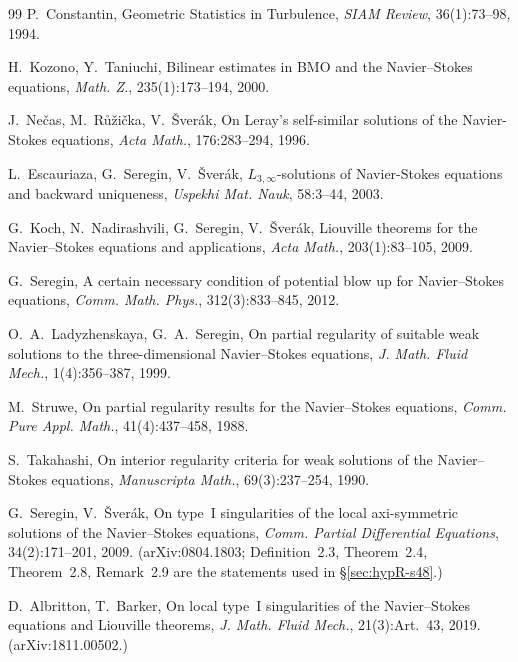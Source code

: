 \documentclass[11pt]{article}
\theoremstyle{definition}
\theoremstyle{remark}
\begin{document}
\begin{thebibliography}{99}
  P.~Constantin,
  Geometric Statistics in Turbulence,
  \emph{SIAM Review}, 36(1):73--98, 1994.

  H.~Kozono, Y.~Taniuchi,
  Bilinear estimates in BMO and the Navier--Stokes equations,
  \emph{Math. Z.}, 235(1):173--194, 2000.

  J.~Ne\v{c}as, M.~R\r{u}\v{z}i\v{c}ka, V.~\v{S}ver\'ak,
  On Leray's self-similar solutions of the Navier-Stokes equations,
  \emph{Acta Math.}, 176:283--294, 1996.

  L.~Escauriaza, G.~Seregin, V.~\v{S}ver\'ak,
  $L_{3,\infty}$-solutions of Navier-Stokes equations and backward uniqueness,
  \emph{Uspekhi Mat. Nauk}, 58:3--44, 2003.

  G.~Koch, N.~Nadirashvili, G.~Seregin, V.~\v{S}ver\'ak,
  Liouville theorems for the Navier--Stokes equations and applications,
  \emph{Acta Math.}, 203(1):83--105, 2009.

  G.~Seregin,
  A certain necessary condition of potential blow up for Navier--Stokes
  equations,
  \emph{Comm. Math. Phys.}, 312(3):833--845, 2012.

  O.~A.~Ladyzhenskaya, G.~A.~Seregin,
  On partial regularity of suitable weak solutions to the three-dimensional
  Navier--Stokes equations,
  \emph{J. Math. Fluid Mech.}, 1(4):356--387, 1999.

  M.~Struwe,
  On partial regularity results for the Navier--Stokes equations,
  \emph{Comm. Pure Appl. Math.}, 41(4):437--458, 1988.

  S.~Takahashi,
  On interior regularity criteria for weak solutions of the Navier--Stokes
  equations,
  \emph{Manuscripta Math.}, 69(3):237--254, 1990.

  G.~Seregin, V.~\v{S}ver\'ak,
  On type~I singularities of the local axi-symmetric solutions of the
  Navier--Stokes equations,
  \emph{Comm. Partial Differential Equations}, 34(2):171--201, 2009.
  (arXiv:0804.1803; Definition~2.3, Theorem~2.4, Theorem~2.8, Remark~2.9
  are the statements used in \S\ref{sec:hypR-s48}.)

  D.~Albritton, T.~Barker,
  On local type~I singularities of the Navier--Stokes equations and Liouville
  theorems,
  \emph{J. Math. Fluid Mech.}, 21(3):Art.~43, 2019. (arXiv:1811.00502.)


\end{thebibliography}
\end{document}
